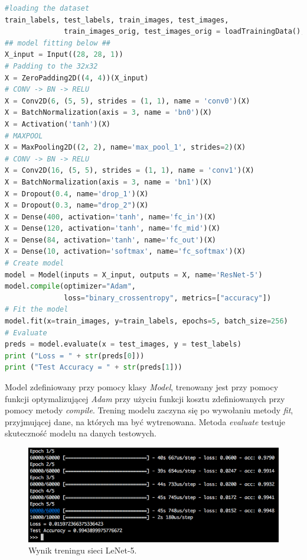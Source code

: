 \label{lst:lenet5keras}
\begin{lstlisting}[language=Python, caption={Model sieci LeNet-5 w Keras.}, captionpos=b]
#loading the dataset
train_labels, test_labels, train_images, test_images, 
              train_images_orig, test_images_orig = loadTrainingData();
## model fitting below ##
X_input = Input((28, 28, 1))
# Padding to the 32x32
X = ZeroPadding2D((4, 4))(X_input)
# CONV -> BN -> RELU
X = Conv2D(6, (5, 5), strides = (1, 1), name = 'conv0')(X)
X = BatchNormalization(axis = 3, name = 'bn0')(X)
X = Activation('tanh')(X)
# MAXPOOL
X = MaxPooling2D((2, 2), name='max_pool_1', strides=2)(X)
# CONV -> BN -> RELU
X = Conv2D(16, (5, 5), strides = (1, 1), name = 'conv1')(X)
X = BatchNormalization(axis = 3, name = 'bn1')(X)
X = Dropout(0.4, name='drop_1')(X)
X = Dropout(0.3, name="drop_2")(X)
X = Dense(400, activation='tanh', name='fc_in')(X)
X = Dense(120, activation='tanh', name='fc_mid')(X)
X = Dense(84, activation='tanh', name='fc_out')(X)
X = Dense(10, activation='softmax', name='fc_softmax')(X)
# Create model
model = Model(inputs = X_input, outputs = X, name='ResNet-5')
model.compile(optimizer="Adam", 
              loss="binary_crossentropy", metrics=["accuracy"])
# Fit the model
model.fit(x=train_images, y=train_labels, epochs=5, batch_size=256)
# Evaluate
preds = model.evaluate(x = test_images, y = test_labels)
print ("Loss = " + str(preds[0]))
print ("Test Accuracy = " + str(preds[1]))
\end{lstlisting}

Model zdefiniowany przy pomocy klasy \textit{Model}, trenowany jest przy pomocy funkcji optymalizującej \textit{Adam} przy użyciu funkcji 
kosztu  zdefiniowanych przy pomocy metody \textit{compile}. Trening modelu zaczyna się po wywołaniu metody \textit{fit}, przyjmującej dane, na których ma być wytrenowana.
Metoda \textit{evaluate} testuje skuteczność modelu na danych testowych.

\begin{figure}[ht]
\centerline{\includegraphics[scale=0.5]{resources/training_lenet5.png}}
\caption{Wynik treningu sieci LeNet-5.}
\label{fig:lenet5-training}
\end{figure}

